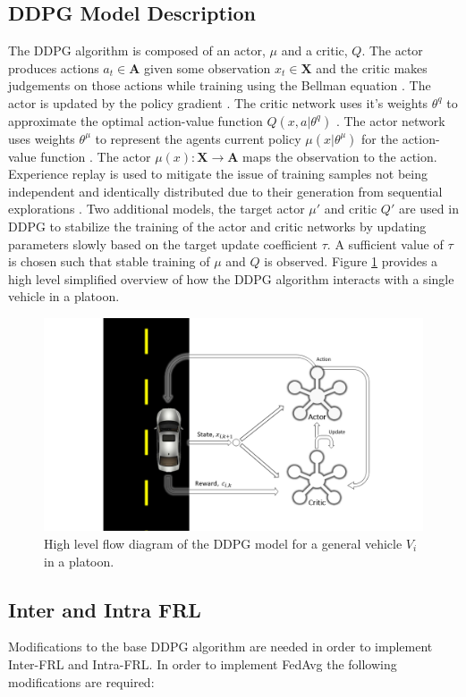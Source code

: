 \subsection{DDPG Model Description}
The DDPG algorithm is composed of an actor, $\mu$ and a critic, $Q$. The actor produces actions $a_t \in \mathbf{A}$ given some observation $x_t \in \mathbf{X}$ and the critic makes judgements on those actions while training using the Bellman equation \cite{Lillicrap2016, sutton2018reinforcement}. The actor is updated by the policy gradient \cite{Lillicrap2016}.  The critic network uses it's weights $\theta^q$ to approximate the optimal action-value function $Q(x, a|\theta^q)$ \cite{Lillicrap2016}.  The actor network uses weights $\theta^\mu$ to represent the agents current policy $\mu(x|\theta^\mu)$ for the action-value function \cite{Lillicrap2016}.  The actor $\mu(x): \mathbf{X} \xrightarrow{} \mathbf{A}$ maps the observation to the action.  Experience replay is used to mitigate the issue of training samples not being independent and identically distributed due to their generation from sequential explorations \cite{Lillicrap2016}.  Two additional models, the target actor $\mu'$ and critic $Q'$ are used in DDPG to stabilize the training of the actor and critic networks by updating parameters slowly based on the target update coefficient $\tau$.  A sufficient value of $\tau$ is chosen such that stable training of $\mu$ and $Q$ is observed.  Figure \ref{fig:ddpgdraw} provides a high level simplified overview of how the DDPG algorithm interacts with a single vehicle in a platoon.  

\begin{figure}[H]
    \centering
    \includegraphics[width=0.6\linewidth]{assets/ddpg.PNG}
    \caption{High level flow diagram of the DDPG model for a general vehicle $V_i$ in a platoon.}
    \label{fig:ddpgdraw}
\end{figure}

\subsection{Inter and Intra FRL}
Modifications to the base DDPG algorithm are needed in order to implement Inter-FRL and Intra-FRL.  In order to implement FedAvg the following modifications are required:

